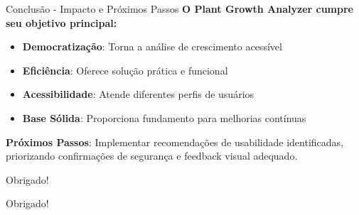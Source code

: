 \documentclass[landscape, 12pt]{beamer}
\begin{document}
\begin{frame}{Conclusão - Impacto e Próximos Passos}
    \textbf{O Plant Growth Analyzer cumpre seu objetivo principal:}
    
    \vspace{0.3cm}
    \begin{itemize}
        \item \textbf{Democratização}: Torna a análise de crescimento acessível
        \item \textbf{Eficiência}: Oferece solução prática e funcional
        \item \textbf{Acessibilidade}: Atende diferentes perfis de usuários
        \item \textbf{Base Sólida}: Proporciona fundamento para melhorias contínuas
    \end{itemize}
    
    \vspace{0.5cm}
    \textbf{Próximos Passos}: Implementar recomendações de usabilidade identificadas, priorizando confirmações de segurança e feedback visual adequado.
\end{frame}

\begin{frame}{Obrigado!}
    \begin{center}
        \Huge{Obrigado!}
    \end{center}
\end{frame}
\end{document}
